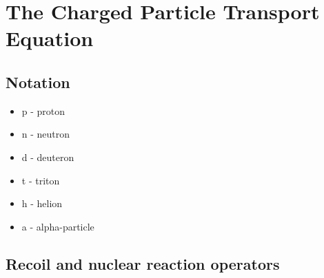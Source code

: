\section{The Charged Particle Transport Equation}

\subsection{Notation}
\begin{itemize}
  \item p - proton
  \item n - neutron
  \item d - deuteron
  \item t - triton
  \item h - helion
  \item a - alpha-particle
\end{itemize}

\subsection{Recoil and nuclear reaction operators}